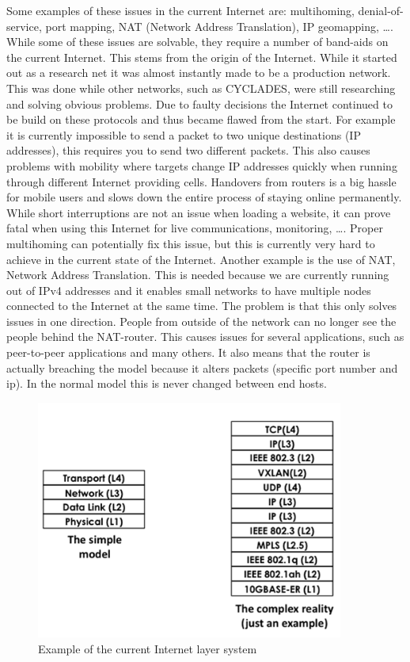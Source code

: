 Some examples of these issues in the current Internet are: multihoming, denial-of-service, port mapping, NAT (Network Address Translation), IP geomapping, \ldots. While some of these issues are solvable, they require a number of band-aids on the current Internet. This stems from the origin of the Internet. While it started out as a research net it was almost instantly made to be a production network. This was done while other networks, such as CYCLADES, were still researching and solving obvious problems. Due to faulty decisions the Internet continued to be build on these protocols and thus became flawed from the start. For example it is currently impossible to send a packet to two unique destinations (IP addresses), this requires you to send two different packets. This also causes problems with mobility where targets change IP addresses quickly when running through different Internet providing cells. Handovers from routers is a big hassle for mobile users and slows down the entire process of staying online permanently. While short interruptions are not an issue when loading a website, it can prove fatal when using this Internet for live communications, monitoring, \ldots. Proper multihoming can potentially fix this issue, but this is currently very hard to achieve in the current state of the Internet. 
\npar
Another example is the use of NAT, Network Address Translation. This is needed because we are currently running out of IPv4 addresses and it enables small networks to have multiple nodes connected to the Internet at the same time. The problem is that this only solves issues in one direction. People from outside of the network can no longer see the people behind the NAT-router. This causes issues for several applications, such as peer-to-peer applications and many others. It also means that the router is actually breaching the model because it alters packets (specific port number and ip). In the normal model this is never changed between end hosts.
\npar
\begin{figure}[H]
    \centering
    \includegraphics[width=0.9\textwidth]{figures/layeractualexamplenorina}
    \caption{Example of the current Internet layer system \citep{pwp:rinaintro}} 
    \label{fig:layeractualexamplenorina}
\end{figure}
